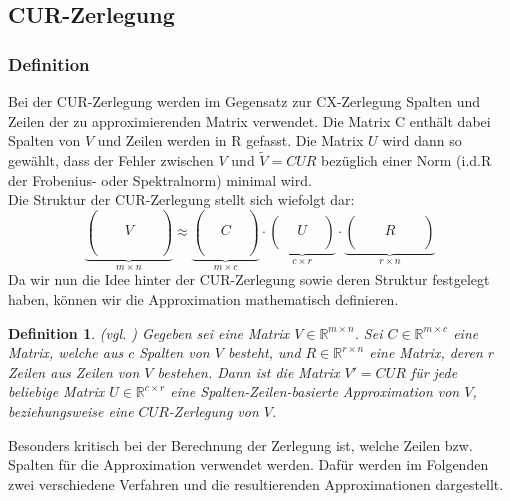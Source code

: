 \documentclass[12pt,a4paper,twoside]{article}
\newtheorem{Definition}[Satz]{Definition}
\begin{document}
	\subsection{CUR-Zerlegung}	
		\label{subsec:CUR}
		\subsubsection{Definition}
		Bei der CUR-Zerlegung werden im Gegensatz zur CX-Zerlegung Spalten und Zeilen der zu approximierenden Matrix 
		verwendet. Die Matrix C enthält dabei Spalten von $V$ und Zeilen werden in R gefasst. Die Matrix $U$ wird 
		dann so gewählt, dass der Fehler zwischen $V$ und $\tilde{V}=CUR$ bezüglich einer Norm (i.d.R der Frobenius- oder Spektralnorm) minimal wird. \\
		Die Struktur der CUR-Zerlegung stellt sich wiefolgt dar:
		\[
			\underbrace{\left(\begin{array}{ccccc}
					  &   &  & & \\ & &  & &  \\ & & V &  &   \\ & & &  &   \\ & & &  &   \\ 
					\end{array}\right)}_{m\times n}
			\approx 
			\underbrace{\left(\begin{array}{ccc}
					 &   &   \\  &   &   \\ & C &   \\ &   &   \\ &   &   \\
					\end{array}\right)}_{m\times c}\cdot 
			\underbrace{\left(\begin{array}{ccc}
					  &   &   \\ & U &   \\ &   &   \\ 
					\end{array}\right)}_{c\times r}\cdot  
			\underbrace{\left(\begin{array}{ccccc}
					  &   &  & & \\ & & R & &  \\ & & &  &   \\ 
					\end{array}\right)}_{r\times n}			
		\]
		Da wir nun die Idee hinter der CUR-Zerlegung sowie deren Struktur festgelegt haben, können wir die 
		Approximation mathematisch definieren.
		\begin{Definition}{(vgl. \citep{Drineas2009})}
			Gegeben sei eine Matrix $V\in \mathds{R}^{m\times n}$. Sei $C\in\mathds{R}^{m\times 
			c}$ eine Matrix, welche aus $c$ Spalten von $V$ besteht, und $R\in\mathds{R}^{r\times n}$ eine Matrix, 
			deren $r$ Zeilen aus Zeilen von $V$ bestehen. Dann ist die Matrix $V'=CUR$ für jede beliebige Matrix $U
			\in\mathds{R}^{c\times r}$ eine Spalten-Zeilen-basierte Approximation von $V$, beziehungsweise eine $CUR
			$-Zerlegung von $V$.
		\end{Definition}
		Besonders kritisch bei der Berechnung der Zerlegung ist, welche Zeilen bzw. Spalten für die Approximation 
		verwendet werden. Dafür werden im Folgenden zwei verschiedene Verfahren und die resultierenden 
		Approximationen dargestellt.
\end{document}
